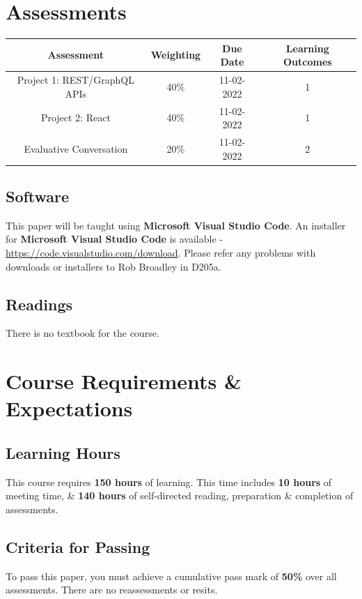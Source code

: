 \documentclass{article}
\begin{document}
\section*{Assessments}
\renewcommand{\arraystretch}{1.5}
\begin{tabular}{|c|c|c|c|}
	\hline
	\textbf{Assessment}                                & \textbf{Weighting} & \textbf{Due Date} & \textbf{Learning Outcomes} \\ \hline 
	\small Project 1: REST/GraphQL APIs                      & \small 40\%        & \small 11-02-2022 & \small 1                   \\ \hline
	\small Project 2: React                       & \small 40\%        & \small 11-02-2022 & \small 1                   \\ \hline
	\small Evaluative Conversation                      & \small 20\%        & \small 11-02-2022 & \small 2                   \\ \hline 
\end{tabular}

\subsection*{Software} 
This paper will be taught using \textbf{Microsoft Visual Studio Code}. An installer for \textbf{Microsoft Visual Studio Code} is available - \href{https://code.visualstudio.com/download}{https://code.visualstudio.com/download}. Please refer any problems with downloads or installers to Rob Broadley in D205a.

\subsection*{Readings}
There is no textbook for the course. 

\section*{Course Requirements \& Expectations}

\subsection*{Learning Hours}
This course requires \textbf{150 hours} of learning. This time includes \textbf{10 hours} of meeting time, \& \textbf{140 hours} of self-directed reading, preparation \& completion of assessments.

\subsection*{Criteria for Passing}
To pass this paper, you must achieve a cumulative pass mark of \textbf{50\%} over all assessments. There are no reassessments or resits.
\end{document}
